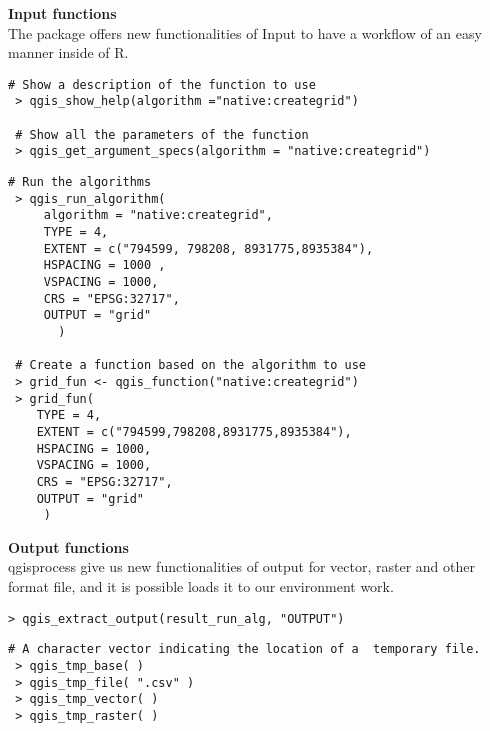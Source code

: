 \documentclass{article}
\begin{document}
\begin{multicols*}{3}
\begin{minipage}{\linewidth}
  \vspace{-5pt}
   \textbf{\fontsize{44}{44}\selectfont \textbf{Input functions}}\vspace{8pt}\\
   The package offers new functionalities of Input to have a workflow of an easy manner inside of R.
\end{minipage}
\begin{lstlisting}[style=Rstyle]
 # Show a description of the function to use
 > qgis_show_help(algorithm ="native:creategrid")

 # Show all the parameters of the function
 > qgis_get_argument_specs(algorithm = "native:creategrid")
\end{lstlisting}
\begin{lstlisting}[style=Rstyle]
 # Run the algorithms
 > qgis_run_algorithm(
     algorithm = "native:creategrid",
     TYPE = 4,
     EXTENT = c("794599, 798208, 8931775,8935384"),
     HSPACING = 1000 ,
     VSPACING = 1000,
     CRS = "EPSG:32717",
     OUTPUT = "grid"
       )

 # Create a function based on the algorithm to use
 > grid_fun <- qgis_function("native:creategrid")
 > grid_fun(
    TYPE = 4,
    EXTENT = c("794599,798208,8931775,8935384"),
    HSPACING = 1000,
    VSPACING = 1000,
    CRS = "EPSG:32717",
    OUTPUT = "grid"
     )
\end{lstlisting}

\begin{minipage}{\linewidth}
  \vspace{12pt}
   \textbf{\fontsize{20}{5}\selectfont \textbf{Output functions}}\vspace{8pt}\\
qgisprocess give us new functionalities of output for vector, raster and other format file, and it is possible loads it  to our environment work.
\end{minipage}

\begin{lstlisting}[style=Rstyle]
 > qgis_extract_output(result_run_alg, "OUTPUT")
\end{lstlisting}
\begin{lstlisting}[style=Rstyle]
# A character vector indicating the location of a  temporary file.
 > qgis_tmp_base( )
 > qgis_tmp_file( ".csv" )
 > qgis_tmp_vector( )
 > qgis_tmp_raster( )
\end{lstlisting}


\end{multicols*}
\end{document}
